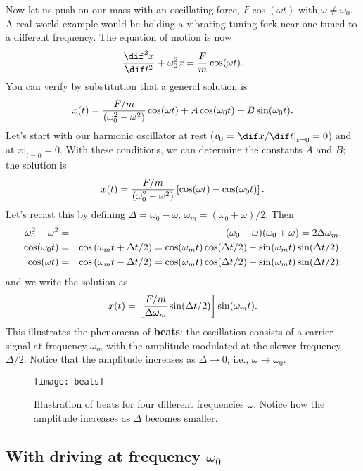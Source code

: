 Now let us push on our mass with an oscillating force, $F\cos(\omega t)$ with $\omega\neq\omega_{0}$. A real world example would be holding a vibrating tuning fork near one tuned to a different frequency.  The equation of motion is now
\begin{equation}\label{e.SHO-driven}
	\DDtt{x} + \omega_{0}^{2}x = \frac{F}{m}\cos(\wt).
\end{equation}
You can verify by substitution that a general solution is
\[
	x(t) = \frac{F/m}{(\omega_{0}^{2}-\omega^{2})}\cos(\omega t) + A\cos(\omega_{0} t)+B\sin(\omega_{0} t).
\]
Let's start with our harmonic oscillator at rest ($v_{0} = \left.\dif x/\dif t\right|_{t=0} = 0$) and at $\left. x\right|_{t=0} = 0$.  With these conditions, we can determine the constants $A$ and $B$; the solution is
\[
	x(t) = \frac{F/m}{(\omega_{0}^{2}-\omega^{2})}\left[\cos(\omega t)-\cos(\omega_{0} t)\right].
\]
Let's recast this by defining $\Delta = \omega_{0} - \omega$, $\omega_{m} = (\omega_{0}+\omega)/2$.  Then
\begin{eqnarray*}
  \omega_{0}^{2}-\omega^{2} &=& (\omega_{0}-\omega)(\omega_{0}+\omega) = 2\Delta\omega_{m},\\
  \cos(\omega_{0} t) &=& \cos\left(\omega_{m} t+\Delta t/2\right) = \cos(\omega_{m} t)\cos(\Delta t/2) - \sin(\omega_{m} t)\sin(\Delta t/2),\\
  \cos(\omega t) &=& \cos\left(\omega_{m} t-\Delta t/2\right) = \cos(\omega_{m} t)\cos(\Delta t/2) + \sin(\omega_{m} t)\sin(\Delta t/2);
\end{eqnarray*}
and we write the solution as
\begin{equation}\label{e.beats}
	x(t) = \left[\frac{F/m}{\Delta\omega_{m}}\sin(\Delta t/2)\right]\sin(\omega_{m} t).
\end{equation}
This illustrates the phenomena of \textbf{beats}: the oscillation consists of a carrier signal at frequency $\omega_{m}$ with the amplitude modulated at the slower frequency $\Delta /2$.  Notice that the amplitude increases as $\Delta \to0$, i.e., $\omega\to\omega_{0}$.

\begin{figure*}[hbt]
\texttt{[image: beats]}
\caption[Illustration of beats for four different frequencies]{Illustration of beats for four different frequencies $\omega$.  Notice how the amplitude increases as $\Delta$ becomes smaller.
\label{f.beats}}
\end{figure*}

\subsection{With driving at frequency $\omega_{0}$}

